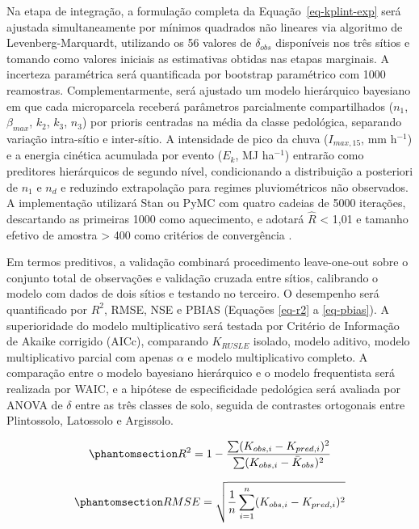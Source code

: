 \documentclass[
  brazilian,
  authoryear,
  preprint]{elsarticle}
\begin{document}
Na etapa de integração, a formulação completa da
Equação~\ref{eq-kplint-exp} será ajustada simultaneamente por mínimos
quadrados não lineares via algoritmo de Levenberg-Marquardt, utilizando
os 56 valores de \(\delta_{obs}\) disponíveis nos três sítios e tomando
como valores iniciais as estimativas obtidas nas etapas marginais. A
incerteza paramétrica será quantificada por bootstrap paramétrico com
1000 reamostras. Complementarmente, será ajustado um modelo hierárquico
bayesiano em que cada microparcela receberá parâmetros parcialmente
compartilhados (\(n_1\), \(\beta_{max}\), \(k_2\), \(k_3\), \(n_3\)) por
prioris centradas na média da classe pedológica, separando variação
intra-sítio e inter-sítio. A intensidade de pico da chuva
(\(I_{max,15}\), mm h\(^{-1}\)) e a energia cinética acumulada por
evento (\(E_k\), MJ ha\(^{-1}\)) entrarão como preditores hierárquicos
de segundo nível, condicionando a distribuição a posteriori de \(n_1\) e
\(n_d\) e reduzindo extrapolação para regimes pluviométricos não
observados. A implementação utilizará Stan ou PyMC com quatro cadeias de
5000 iterações, descartando as primeiras 1000 como aquecimento, e
adotará \(\hat{R}\) \textless{} 1,01 e tamanho efetivo de amostra
\textgreater{} 400 como critérios de convergência
\citep{gelman_et_al_2013}.

Em termos preditivos, a validação combinará procedimento leave-one-out
sobre o conjunto total de observações e validação cruzada entre sítios,
calibrando o modelo com dados de dois sítios e testando no terceiro. O
desempenho será quantificado por \(R^2\), RMSE, NSE e PBIAS (Equações
\ref{eq-r2} a \ref{eq-pbias}). A superioridade do modelo multiplicativo
será testada por Critério de Informação de Akaike corrigido (AICc),
comparando \(K_{RUSLE}\) isolado, modelo aditivo, modelo multiplicativo
parcial com apenas \(\alpha\) e modelo multiplicativo completo. A
comparação entre o modelo bayesiano hierárquico e o modelo frequentista
será realizada por WAIC, e a hipótese de especificidade pedológica será
avaliada por ANOVA de \(\delta\) entre as três classes de solo, seguida
de contrastes ortogonais entre Plintossolo, Latossolo e Argissolo.

\begin{equation}\phantomsection\label{eq-r2}{
R^2 = 1 - \dfrac{\sum(K_{obs,i} - K_{pred,i})^2}{\sum(K_{obs,i} - \bar{K}_{obs})^2}
}\end{equation}

\begin{equation}\phantomsection\label{eq-rmse}{
RMSE = \sqrt{\dfrac{1}{n}\sum_{i=1}^{n}(K_{obs,i} - K_{pred,i})^2}
}\end{equation}
\end{document}
